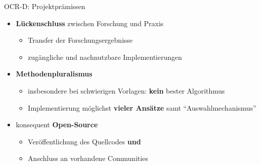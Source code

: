 \documentclass{bbawslides}
\begin{document}
\begin{bbawslide}{OCR-D: Projektprämissen}
  \vspace*{7mm}%
  \centerslidestrue%
  \begin{itemize}
    \item \textbf{Lückenschluss} zwischen Forschung und Praxis
    \begin{itemize}\small
      \item Transfer der Forschungsergebnisse
      \item zugängliche und nachnutzbare Implementierungen
    \end{itemize}
    \item \textbf{Methodenpluralismus}
    \begin{itemize}\small
      \item insbesondere bei schwierigen Vorlagen: \textbf{kein} bester Algorithmus
      \item Implementierung möglichst \textbf{vieler Ansätze} samt \enquote{Auswahlmechanismus}
    \end{itemize}
    \item konsequent \textbf{Open-Source}
    \begin{itemize}\small
      \item Veröffentlichung des Quellcodes \textbf{und}
      \item Anschluss an vorhandene Communities
    \end{itemize}
  \end{itemize}
\end{bbawslide}
\end{document}
